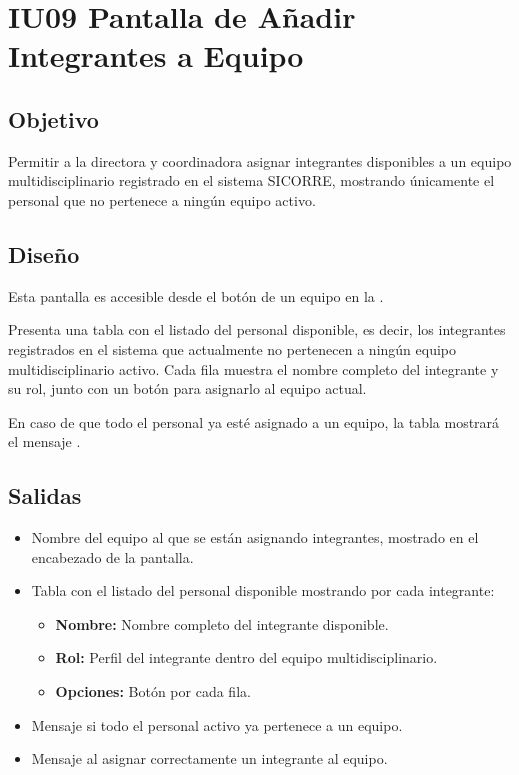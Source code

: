 \section{IU09 Pantalla de Añadir Integrantes a Equipo}

\subsection{Objetivo}
Permitir a la directora y coordinadora asignar integrantes 
disponibles a un equipo multidisciplinario registrado en el 
sistema SICORRE, mostrando únicamente el personal que no 
pertenece a ningún equipo activo.

\subsection{Diseño}
Esta pantalla  
es accesible desde el botón  de un equipo en la 
.

Presenta una tabla con el listado del personal disponible, es decir, 
los integrantes registrados en el sistema que actualmente no 
pertenecen a ningún equipo multidisciplinario activo. Cada fila 
muestra el nombre completo del integrante y su rol, junto con un 
botón  para asignarlo al equipo actual.

En caso de que todo el personal ya esté asignado a un equipo, 
la tabla mostrará el mensaje 
.


\subsection{Salidas}
\begin{itemize}
	\item Nombre del equipo al que se están asignando integrantes, 
	mostrado en el encabezado de la pantalla.
	\item Tabla con el listado del personal disponible mostrando 
	por cada integrante:
	\begin{itemize}
		\item \textbf{Nombre:} Nombre completo del integrante 
		disponible.
		\item \textbf{Rol:} Perfil del integrante dentro del 
		equipo multidisciplinario.
		\item \textbf{Opciones:} Botón  
		por cada fila.
	\end{itemize}
	\item Mensaje  
	si todo el personal activo ya pertenece a un equipo.
	\item Mensaje  
	al asignar correctamente un integrante al equipo.
\end{itemize}

